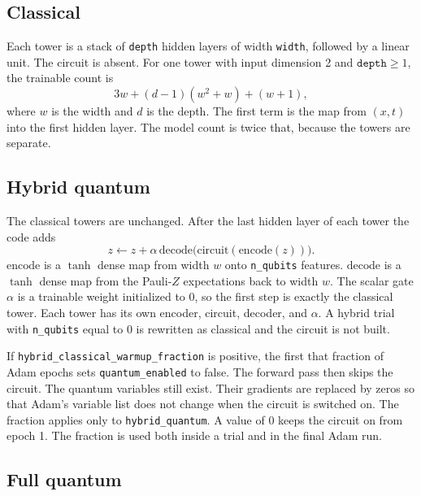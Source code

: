 \documentclass[11pt]{article}
\begin{document}
\subsection{Classical}

Each tower is a stack of \texttt{depth} hidden layers of width \texttt{width}, followed by a linear unit.
The circuit is absent.
For one tower with input dimension 2 and \(\texttt{depth}\ge 1\), the trainable count is
\begin{equation}
3w + (d-1)(w^{2}+w) + (w+1),
\end{equation}
where \(w\) is the width and \(d\) is the depth.
The first term is the map from \((x,t)\) into the first hidden layer.
The model count is twice that, because the towers are separate.

\subsection{Hybrid quantum}

The classical towers are unchanged.
After the last hidden layer of each tower the code adds
\begin{equation}
z \leftarrow z + \alpha\,\mathrm{decode}\big(\mathrm{circuit}(\mathrm{encode}(z))\big).
\end{equation}
\(\mathrm{encode}\) is a \(\tanh\) dense map from width \(w\) onto \texttt{n\_qubits} features.
\(\mathrm{decode}\) is a \(\tanh\) dense map from the Pauli-\(Z\) expectations back to width \(w\).
The scalar gate \(\alpha\) is a trainable weight initialized to 0, so the first step is exactly the classical tower.
Each tower has its own encoder, circuit, decoder, and \(\alpha\).
A hybrid trial with \texttt{n\_qubits} equal to 0 is rewritten as classical and the circuit is not built.

If \texttt{hybrid\_classical\_warmup\_fraction} is positive, the first that fraction of Adam epochs sets \texttt{quantum\_enabled} to false.
The forward pass then skips the circuit.
The quantum variables still exist.
Their gradients are replaced by zeros so that Adam's variable list does not change when the circuit is switched on.
The fraction applies only to \texttt{hybrid\_quantum}.
A value of 0 keeps the circuit on from epoch 1.
The fraction is used both inside a trial and in the final Adam run.

\subsection{Full quantum}
\end{document}
